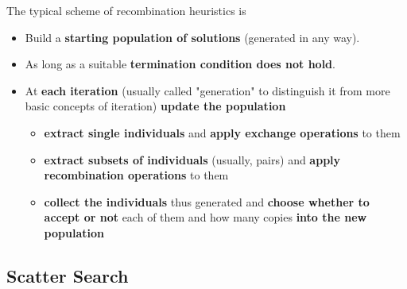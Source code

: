 The typical scheme of recombination heuristics is
\begin{itemize}
	\item Build a \textbf{starting population of solutions} (generated in any way).\\
	
	\item As long as a suitable \textbf{termination condition does not hold}.\\
	
	\item At \textbf{each iteration} (usually called "generation" to distinguish it from more basic concepts of iteration) \textbf{update the population}
	\begin{itemize}
		\item \textbf{extract single individuals} and \textbf{apply exchange operations} to them
		\item \textbf{extract subsets of individuals} (usually, pairs) and \textbf{apply recombination operations} to them
		\item \textbf{collect the individuals} thus generated and \textbf{choose whether to accept or not} each of them and how many copies \textbf{into the new population}
	\end{itemize}
	
\end{itemize}

\newpage

\subsection{Scatter Search}


